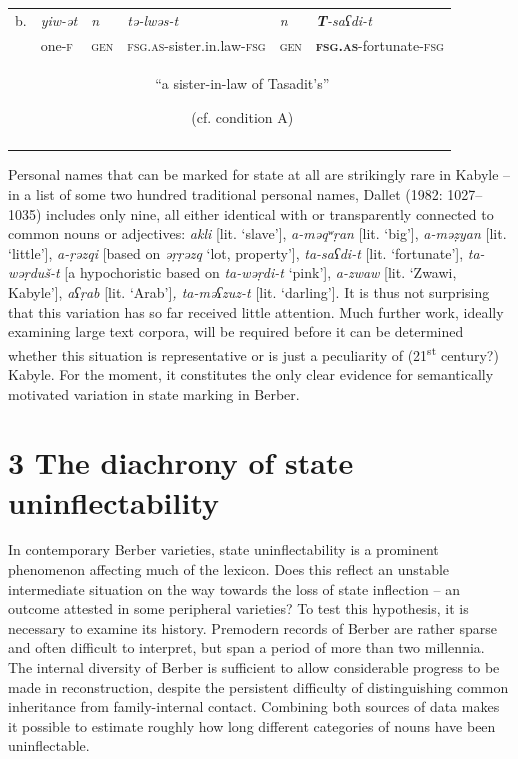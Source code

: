 \documentclass[output=paper]{langscibook}
\begin{document}
\begin{tabularx}{\textwidth}{XXXXXX}

\lsptoprule
b. & \textit{yiw-ət} & \textit{n} & \textit{tə-lwəs-t} & \textit{n} & \textbf{\textit{T}}\textit{{}-saʕdi-t}\\
& one-\textsc{f} & \textsc{gen} & \textsc{fsg.as}{}-sister.in.law-\textsc{fsg} & \textsc{gen} & \textbf{\textsc{fsg.as}}{}-fortunate-\textsc{fsg}\\
& \multicolumn{5}{c}{“a sister-in-law of Tasadit’s”

  (cf. condition A)}\\
\lspbottomrule
\end{tabularx}
\begin{styleStandarduser}
Personal names that can be marked for state at all are strikingly rare in Kabyle – in a list of some two hundred traditional personal names, Dallet (1982: 1027–1035) includes only nine, all either identical with or transparently connected to common nouns or adjectives: \textit{akli} [lit. ‘slave’], \textit{a-məqʷṛan} [lit. ‘big’], \textit{a-məẓyan} [lit. ‘little’], \textit{a-ṛəzqi} [based on \textit{əṛṛəzq} ‘lot, property’], \textit{ta-saʕdi-t} [lit. ‘fortunate’], \textit{ta-wəṛduš-t} [a hypochoristic based on \textit{ta-wəṛdi-t} ‘pink’], \textit{a-zwaw} [lit. ‘Zwawi, Kabyle’], \textit{aʕṛab} [lit. ‘Arab’]\textit{, ta-məʕzuz-t} [lit. ‘darling’]. It is thus not surprising that this variation has so far received little attention. Much further work, ideally examining large text corpora, will be required before it can be determined whether this situation is representative or is just a peculiarity of (21\textsuperscript{st} century?) Kabyle. For the moment, it constitutes the only clear evidence for semantically motivated variation in state marking in Berber.
\end{styleStandarduser}

\section{3 The diachrony of state uninflectability}
\begin{styleStandarduser}
In contemporary Berber varieties, state uninflectability is a prominent phenomenon affecting much of the lexicon. Does this reflect an unstable intermediate situation on the way towards the loss of state inflection – an outcome attested in some peripheral varieties? To test this hypothesis, it is necessary to examine its history. Premodern records of Berber are rather sparse and often difficult to interpret, but span a period of more than two millennia. The internal diversity of Berber is sufficient to allow considerable progress to be made in reconstruction, despite the persistent difficulty of distinguishing common inheritance from family-internal contact. Combining both sources of data makes it possible to estimate roughly how long different categories of nouns have been uninflectable.
\end{styleStandarduser}
\end{document}
